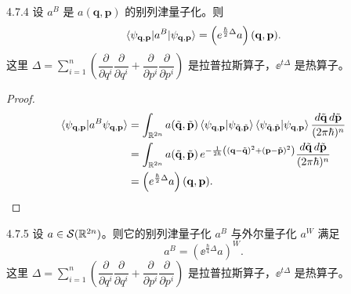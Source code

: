 \begin{proposition}{4.7.4}
  设 $a^B$ 是 $a(\mathbf q,\mathbf p)$ 的别列津量子化。则
  \[
  \langle \psi_{\mathbf q,\mathbf p}|a^B|\psi_{\mathbf q,\mathbf p}\rangle
  =\left(e^{\frac{\hbar}{2}\Delta}a\right)(\mathbf q,\mathbf p).
  \]
  这里
  $\Delta=\sum\limits_{i=1}^{n}\left(\dfrac{\partial}{\partial q^i}
  \dfrac{\partial}{\partial q^i}
  +\dfrac{\partial}{\partial p^i}\dfrac{\partial}{\partial p^i}\right)$
  是拉普拉斯算子，$\ee^{t\Delta}$ 是热算子。
\end{proposition}

\begin{proof}
\begin{align*}
\langle \psi_{\mathbf q,\mathbf p}|a^B\psi_{\mathbf q,\mathbf p}\rangle
&=\int_{\mathbb{R}^{2n}}a(\tilde{\mathbf q},\tilde{\mathbf p})\,
\langle \psi_{\mathbf q,\mathbf p}|\psi_{\tilde{\mathbf q},\tilde{\mathbf p}}\rangle\,
\langle \psi_{\tilde{\mathbf q},\tilde{\mathbf p}}|\psi_{\mathbf q,\mathbf p}\rangle\,
\frac{d\tilde{\mathbf q}\,d\tilde{\mathbf p}}{(2\pi\hbar)^n}\\
&=\int_{\mathbb{R}^{2n}}a(\tilde{\mathbf q},\tilde{\mathbf p})\,
e^{-\frac{1}{2\hbar}\left((\mathbf q-\tilde{\mathbf q})^2
+(\mathbf p-\tilde{\mathbf p})^2\right)}
\frac{d\tilde{\mathbf q}\,d\tilde{\mathbf p}}{(2\pi\hbar)^n}\\
&=\left(e^{\frac{\hbar}{2}\Delta}a\right)(\mathbf q,\mathbf p).
\end{align*}
\end{proof}

\begin{proposition}{4.7.5}
  设 $a\in\mathcal S(\mathbb{R}^{2n})$。则它的别列津量子化 $a^B$ 与外尔量子化 $a^W$
  满足
  \[
  a^B=\left(\ee^{\frac{\hbar}{4}\Delta}a\right)^W.
  \]
  这里
  $\Delta=\sum\limits_{i=1}^{n}\left(\dfrac{\partial}{\partial q^i}
  \dfrac{\partial}{\partial q^i}
  +\dfrac{\partial}{\partial p^i}\dfrac{\partial}{\partial p^i}\right)$
  是拉普拉斯算子，$\ee^{t\Delta}$ 是热算子。
\end{proposition}

